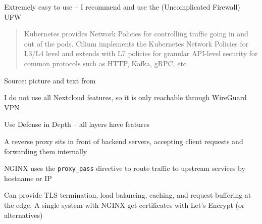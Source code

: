 \documentclass[Screen16to9,17pt]{foils}
\begin{document}
\begin{list2}
\item Extremely easy to use -- I recommend and use the (Uncomplicated Firewall) UFW
\end{list2}



\begin{quote}
Kubernetes provides Network Policies for controlling traffic going in and out of the pods. Cilium implements the Kubernetes Network Policies for L3/L4 level and extends with L7 policies for granular API-level security for common protocols such as HTTP, Kafka, gRPC, etc
\end{quote}
Source: picture and text from 

I do not use all Nextcloud features, so it is only reachable through WireGuard VPN




\centerline{Use Defense in Depth -- all layers have features}




\begin{list2}
\item A reverse proxy sits in front of backend servers, accepting client requests and forwarding them internally
\item NGINX uses the \verb+proxy_pass+ directive to route traffic to upstream services by hostname or IP
\item Can provide TLS termination, load balancing, caching, and request buffering at the edge. A single system with NGINX get certificates with Let's Encrypt (or alternatives)
\end{list2}


\end{document}
